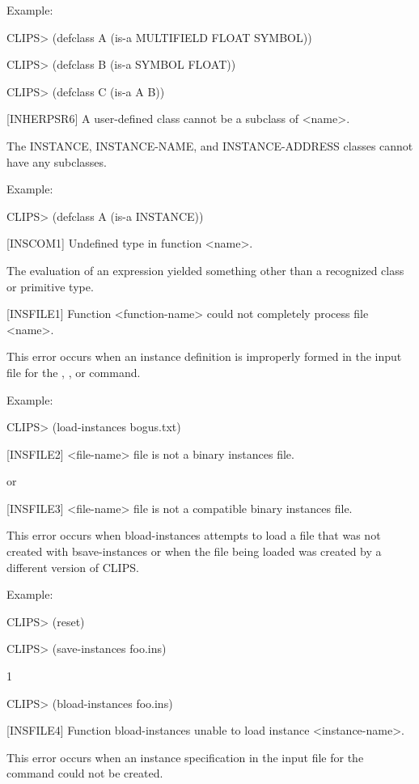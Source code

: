 \documentclass[letterpaper,10pt,english]{sphinxmanual}
\begin{document}
Example:

CLIPS\textgreater{} (defclass A (is-a MULTIFIELD FLOAT SYMBOL))

CLIPS\textgreater{} (defclass B (is-a SYMBOL FLOAT))

CLIPS\textgreater{} (defclass C (is-a A B))

{[}INHERPSR6{]} A user-defined class cannot be a subclass of \textless{}name\textgreater{}.

The INSTANCE, INSTANCE-NAME, and INSTANCE-ADDRESS classes cannot have
any subclasses.

Example:

CLIPS\textgreater{} (defclass A (is-a INSTANCE))

{[}INSCOM1{]} Undefined type in function \textless{}name\textgreater{}.

The evaluation of an expression yielded something other than a
recognized class or primitive type.

{[}INSFILE1{]} Function \textless{}function-name\textgreater{} could not completely process file
\textless{}name\textgreater{}.

This error occurs when an instance definition is improperly formed in
the input file for the , , or
 command.

Example:

CLIPS\textgreater{} (load-instances bogus.txt)

{[}INSFILE2{]} \textless{}file-name\textgreater{} file is not a binary instances file.

or

{[}INSFILE3{]} \textless{}file-name\textgreater{} file is not a compatible binary instances file.

This error occurs when bload-instances attempts to load a file that was
not created with bsave-instances or when the file being loaded was
created by a different version of CLIPS.

Example:

CLIPS\textgreater{} (reset)

CLIPS\textgreater{} (save-instances foo.ins)

1

CLIPS\textgreater{} (bload-instances foo.ins)

{[}INSFILE4{]} Function bload-instances unable to load instance
\textless{}instance-name\textgreater{}.

This error occurs when an instance specification in the input file for
the  command could not be created.
\end{document}
